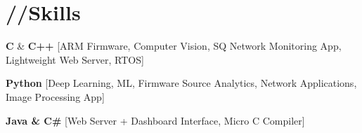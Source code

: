\documentclass[10pt, letterpaper]{article}
\newcommand{\emphasis}[1]{
    \textcolor{purduegold}{\textbf{#1}}
}
\begin{document}
\section*{\huge{//Skills}}
    \begin{enumerate}[label={[\arabic*]}]
        \setcounter{enumi}{-1}
        \item \emphasis{C} \& \emphasis{C++}\hspace{10pt}[ARM Firmware, Computer Vision, SQ Network Monitoring App, Lightweight Web Server, RTOS]\\
            \hspace*{1in}{Frameworks $\rightarrowtriangle$ [OpenCV, QT, CUDA, libArgus]}
        \item \emphasis{Python}\hspace{26pt}[Deep Learning, ML, Firmware Source Analytics, Network Applications, Image Processing App]\\
            \hspace*{1in}{Frameworks $\rightarrowtriangle$ [Scikit, Numpy, PyTorch, Keras, OpenCV, PyQT]}
        \item \emphasis{Java \& C\#}\hspace{10pt}[Web Server + Dashboard Interface, Micro C Compiler]\\
            \hspace*{1in}{Frameworks $\rightarrowtriangle$ [Apache, Boostrap CSS, Ajax, WMI, .NET]}
        
    \end{enumerate}
    \vspace{-10mm}
\end{document}
